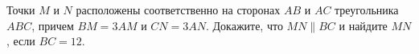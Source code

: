 \begin{ex}
	\begin{condition}
		Точки \( M  \) и \( N  \) расположены соответственно на сторонах \( AB  \) и \( AC  \) треугольника \( ABC \), причем \( BM = 3AM  \) и \( CN = 3AN \). Докажите, что \( MN \parallel BC \) и найдите \( MN \), если \( BC = 12 \).
	\end{condition}
\end{ex}